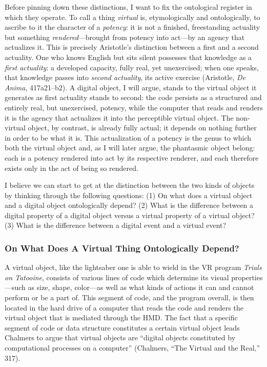 \documentclass{article}
\begin{document}
Before pinning down these distinctions, I want to fix the ontological register in which they operate. To call a thing \textit{virtual} is, etymologically and ontologically, to ascribe to it the character of a \textit{potency}: it is not a finished, freestanding actuality but something \textit{rendered}—brought from potency into act—by an agency that actualizes it. This is precisely Aristotle's distinction between a first and a second actuality. One who knows English but sits silent possesses that knowledge as a \textit{first actuality}: a developed capacity, fully real, yet unexercised; when one speaks, that knowledge passes into \textit{second actuality}, its active exercise (Aristotle, \textit{De Anima}, 417a21–b2). A digital object, I will argue, stands to the virtual object it generates as first actuality stands to second: the code persists as a structured and entirely real, but unexercised, potency, while the computer that reads and renders it is the agency that actualizes it into the perceptible virtual object. The non-virtual object, by contrast, is already fully actual; it depends on nothing further in order to be what it is. This actualization of a potency is the genus to which both the virtual object and, as I will later argue, the phantasmic object belong: each is a potency rendered into act by its respective renderer, and each therefore exists only in the act of being so rendered.

I believe we can start to get at the distinction between the two kinds of objects by thinking through the following questions: (1) On what does a virtual object and a digital object ontologically depend? (2) What is the difference between a digital property of a digital object versus a virtual property of a virtual object? (3) What is the difference between a digital event and a virtual event?

\subsubsection*{On What Does A Virtual Thing Ontologically Depend?}

A virtual object, like the lightsaber one is able to wield in the VR program \textit{Trials on Tatooine}, consists of various lines of code which determine its visual properties—such as size, shape, color—as well as what kinds of actions it can and cannot perform or be a part of. This segment of code, and the program overall, is then located in the hard drive of a computer that reads the code and renders the virtual object that is mediated through the HMD. The fact that a specific segment of code or data structure constitutes a certain virtual object leads Chalmers to argue that virtual objects are ``digital objects constituted by computational processes on a computer'' (Chalmers, ``The Virtual and the Real,'' 317).
\end{document}
